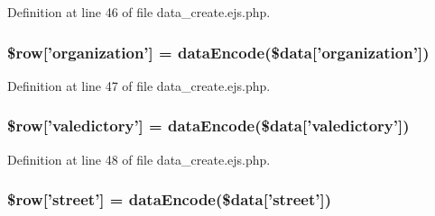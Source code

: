 \-Definition at line 46 of file data\-\_\-create.\-ejs.\-php.

\hypertarget{miscellaneous_2mysettings_2data__create_8ejs_8php_a69213631c5b3eaacd5809b9c8d3721c2}{
\subsubsection[{\$row}]{\setlength{\rightskip}{0pt plus 5cm}\$row\mbox{[}'organization'\mbox{]} = {\bf data\-Encode}(\$data\mbox{[}'organization'\mbox{]})}}\label{miscellaneous_2mysettings_2data__create_8ejs_8php_a69213631c5b3eaacd5809b9c8d3721c2}


\-Definition at line 47 of file data\-\_\-create.\-ejs.\-php.

\hypertarget{miscellaneous_2mysettings_2data__create_8ejs_8php_a03936db500530c616c892f3db51586a9}{
\subsubsection[{\$row}]{\setlength{\rightskip}{0pt plus 5cm}\$row\mbox{[}'valedictory'\mbox{]} = {\bf data\-Encode}(\$data\mbox{[}'valedictory'\mbox{]})}}\label{miscellaneous_2mysettings_2data__create_8ejs_8php_a03936db500530c616c892f3db51586a9}


\-Definition at line 48 of file data\-\_\-create.\-ejs.\-php.

\hypertarget{miscellaneous_2mysettings_2data__create_8ejs_8php_a7333deeacbe82dc6e01b7e9e86eb3e5a}{
\subsubsection[{\$row}]{\setlength{\rightskip}{0pt plus 5cm}\$row\mbox{[}'street'\mbox{]} = {\bf data\-Encode}(\$data\mbox{[}'street'\mbox{]})}}\label{miscellaneous_2mysettings_2data__create_8ejs_8php_a7333deeacbe82dc6e01b7e9e86eb3e5a}


